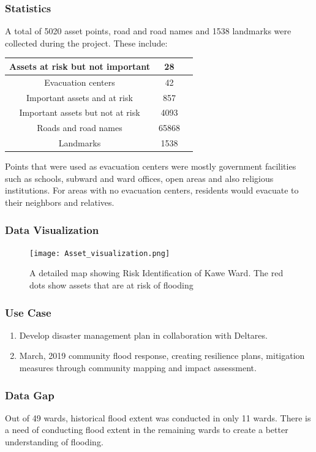 \documentclass[a4paper,12pt,twoside]{article}
\begin{document}
\subsubsection{Statistics}
A total of 5020 asset points, road and road names and 1538 landmarks were collected during the project. These include:
\begin{center}
\begin{tabular}{ |c|c|c| }
 \hline
 Assets at risk but not important & 28 \\ 
 \hline
 Evacuation centers & 42 \\ 
 \hline
 Important assets and at risk & 857 \\
 \hline
 Important assets but not at risk & 4093 \\
 \hline
 Roads and road names & 65868 \\
 \hline
 Landmarks & 1538 \\
 \hline 
\end{tabular}
\end{center}
Points that were used as evacuation centers were mostly government facilities such as schools, subward and ward offices, open areas and also religious institutions. For areas with no evacuation centers, residents would evacuate to their neighbors and relatives.

\subsubsection{Data Visualization}
\begin{figure}[h]
{\color{RHgreen}\caption{A detailed map showing Risk Identification of Kawe Ward. The red dots show assets that are at risk of flooding}}
 \centering
 \texttt{[image: Asset\_visualization.png]}
\end{figure}

\subsubsection{Use Case}
\begin{enumerate}
    \item Develop disaster management plan in collaboration with Deltares.
    \item March, 2019 community flood response, creating resilience plans, mitigation measures through community mapping and impact assessment.
\end{enumerate}


\subsubsection{Data Gap}
Out of 49 wards, historical flood extent was conducted in only 11 wards. There is a need of conducting flood extent in the remaining wards to create a better understanding of flooding.
\end{document}
